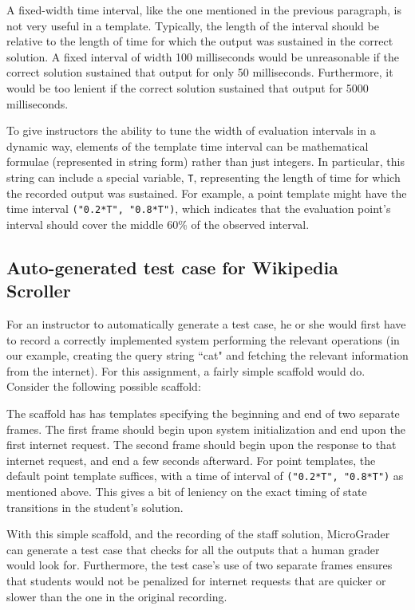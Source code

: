 \documentclass[12pt]{article}
\begin{document}
A fixed-width time interval, like the one mentioned in the previous paragraph, is not very useful in a template.  Typically, the length of the interval should be relative to the length of time for which the output was sustained in the correct solution.  A fixed interval of width 100 milliseconds would be unreasonable if the correct solution sustained that output for only 50 milliseconds.  Furthermore, it would be too lenient if the correct solution sustained that output for 5000 milliseconds.

To give instructors the ability to tune the width of evaluation intervals in a dynamic way, elements of the template time interval can be mathematical formulae (represented in string form) rather than just integers.  In particular, this string can include a special variable, \texttt{T}, representing the length of time for which the recorded output was sustained.  For example, a point template might have the time interval \texttt{("0.2*T", "0.8*T")}, which indicates that the evaluation point's interval should cover the middle 60\% of the observed interval. 

\subsection{Auto-generated test case for Wikipedia Scroller}
For an instructor to automatically generate a test case, he or she would first have to record a correctly implemented system performing the relevant operations (in our example, creating the query string ``cat" and fetching the relevant information from the internet).  For this assignment, a fairly simple scaffold would do.  Consider the following possible scaffold:

The scaffold has has templates specifying the beginning and end of two separate frames.  The first frame should begin upon system initialization and end upon the first internet request.  The second frame should begin upon the response to that internet request, and end a few seconds afterward.  For point templates, the default point template suffices, with a time of interval of \texttt{("0.2*T", "0.8*T")} as mentioned above.  This gives a bit of leniency on the exact timing of state transitions in the student's solution.

With this simple scaffold, and the recording of the staff solution, MicroGrader can generate a test case that checks for all the outputs that a human grader would look for.  Furthermore, the test case's use of two separate frames ensures that students would not be penalized for internet requests that are quicker or slower than the one in the original recording.
\end{document}
